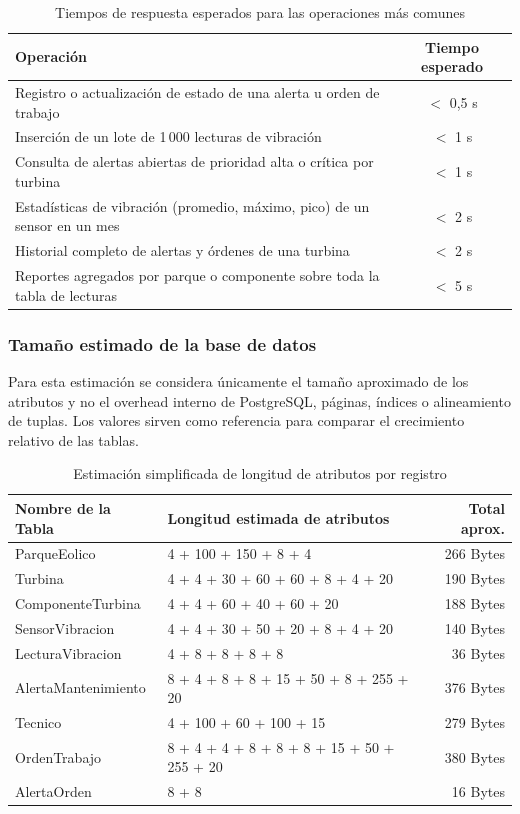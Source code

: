 \documentclass[11pt,a4paper]{article}
\begin{document}
\begin{table}[H]
\centering
\small
\caption{Tiempos de respuesta esperados para las operaciones más comunes}
\label{tab:tiempos_respuesta}
\begin{tabular}{|p{10.5cm}|c|}
\hline
\textbf{Operación} & \textbf{Tiempo esperado} \\ \hline
Registro o actualización de estado de una alerta u orden de trabajo & $<$ 0,5 s \\ \hline
Inserción de un lote de 1\,000 lecturas de vibración & $<$ 1 s \\ \hline
Consulta de alertas abiertas de prioridad alta o crítica por turbina & $<$ 1 s \\ \hline
Estadísticas de vibración (promedio, máximo, pico) de un sensor en un mes & $<$ 2 s \\ \hline
Historial completo de alertas y órdenes de una turbina & $<$ 2 s \\ \hline
Reportes agregados por parque o componente sobre toda la tabla de lecturas & $<$ 5 s \\ \hline
\end{tabular}
\end{table}

\subsubsection{Tamaño estimado de la base de datos}

Para esta estimación se considera únicamente el tamaño aproximado de los atributos y
no el overhead interno de PostgreSQL, páginas, índices o alineamiento de tuplas.
Los valores sirven como referencia para comparar el crecimiento relativo de las
tablas.

\par\bigskip

\begin{table}[H]
\centering
\small
\caption{Estimación simplificada de longitud de atributos por registro}
\label{tab:longitud_bytes_tablas}
\begin{tabular}{|l|l|r|}
\hline
\textbf{Nombre de la Tabla} & \textbf{Longitud estimada de atributos} & \textbf{Total aprox.} \\ \hline
ParqueEolico & 4 + 100 + 150 + 8 + 4 & 266 Bytes \\ \hline
Turbina & 4 + 4 + 30 + 60 + 60 + 8 + 4 + 20 & 190 Bytes \\ \hline
ComponenteTurbina & 4 + 4 + 60 + 40 + 60 + 20 & 188 Bytes \\ \hline
SensorVibracion & 4 + 4 + 30 + 50 + 20 + 8 + 4 + 20 & 140 Bytes \\ \hline
LecturaVibracion & 4 + 8 + 8 + 8 + 8 & 36 Bytes \\ \hline
AlertaMantenimiento & 8 + 4 + 8 + 8 + 15 + 50 + 8 + 255 + 20 & 376 Bytes \\ \hline
Tecnico & 4 + 100 + 60 + 100 + 15 & 279 Bytes \\ \hline
OrdenTrabajo & 8 + 4 + 4 + 8 + 8 + 8 + 15 + 50 + 255 + 20 & 380 Bytes \\ \hline
AlertaOrden & 8 + 8 & 16 Bytes \\ \hline
\end{tabular}
\end{table}
\end{document}
